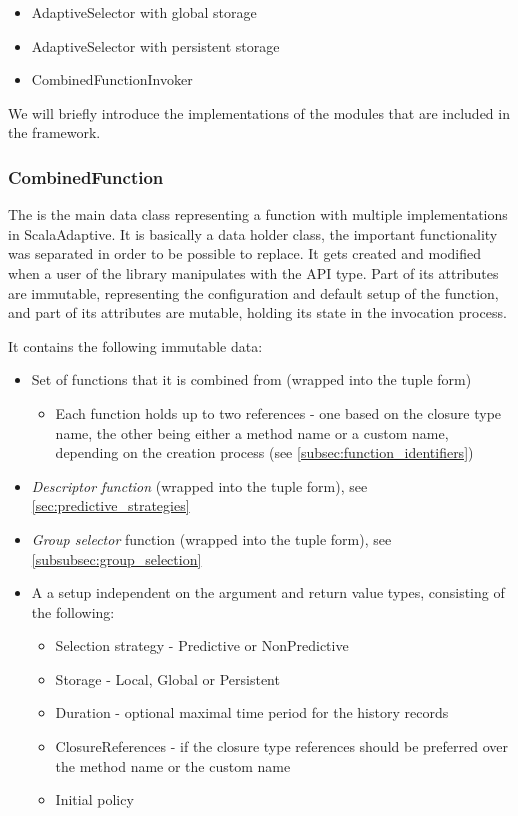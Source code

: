 \begin{itemize}
	\item AdaptiveSelector with global storage
	\item AdaptiveSelector with persistent storage
	\item CombinedFunctionInvoker
\end{itemize}

We will briefly introduce the implementations of the modules that are included in the framework.

\subsubsection{CombinedFunction}

The  is the main data class representing a function with multiple implementations in ScalaAdaptive. It is basically a data holder class, the important functionality was separated in order to be possible to replace. It gets created and modified when a user of the library manipulates with the  API type. Part of its attributes are immutable, representing the configuration and default setup of the function, and part of its attributes are mutable, holding its state in the invocation process.

It contains the following immutable data:

\begin{itemize}
	\item Set of functions that it is combined from (wrapped into the tuple form)
	\begin{itemize}
		\item	Each function holds up to two references - one based on the closure type name, the other being either a method name or a custom name, depending on the creation process (see \ref{subsec:function_identifiers})
	\end{itemize}
	\item \textit{Descriptor function} (wrapped into the tuple form), see \ref{sec:predictive_strategies}
	\item \textit{Group selector} function (wrapped into the tuple form), see \ref{subsubsec:group_selection}
	\item A  a setup independent on the argument and return value types, consisting of the following:
	\begin{itemize}
		\item Selection strategy - Predictive or NonPredictive
		\item Storage - Local, Global or Persistent
		\item Duration - optional maximal time period for the history records
		\item ClosureReferences - if the closure type references should be preferred over the method name or the custom name
		\item Initial policy
	\end{itemize}
\end{itemize}

